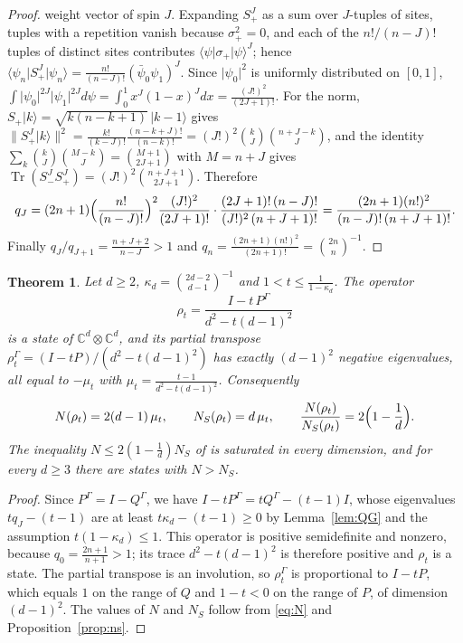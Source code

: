 \documentclass[11pt,a4paper]{article}
\newtheorem{theorem}{Theorem}
\theoremstyle{definition}
\theoremstyle{plain}
\DeclareMathOperator{\Tr}{Tr}
\newcommand{\ket}[1]{\lvert#1\rangle}
\newcommand{\bra}[1]{\langle#1\rvert}
\newcommand{\norm}[1]{\lVert#1\rVert}
\newcommand{\C}{\mathbb{C}}
\newcommand{\NS}{N_{S}}
\newcommand{\G}{\Gamma}
\begin{document}
\begin{proof}
weight vector of spin $J$. Expanding $S_+^J$ as a sum over $J$-tuples of
sites, tuples with a repetition vanish because $\sigma_+^2=0$, and each of the
$n!/(n-J)!$ tuples of distinct sites contributes
$\bra\psi\sigma_+\ket\psi^J$; hence
$\bra{\psi_n}S_+^J\ket{\psi_n}=\frac{n!}{(n-J)!}(\bar\psi_0\psi_1)^J$. Since
$\lvert\psi_0\rvert^2$ is uniformly distributed on $[0,1]$,
$\int\lvert\psi_0\rvert^{2J}\lvert\psi_1\rvert^{2J}d\psi=\int_0^1x^J(1-x)^Jdx
=\frac{(J!)^2}{(2J+1)!}$. For the norm,
$S_+\ket k=\sqrt{k(n-k+1)}\,\ket{k-1}$ gives
$\norm{S_+^J\ket k}^2=\frac{k!}{(k-J)!}\frac{(n-k+J)!}{(n-k)!}
=(J!)^2\binom kJ\binom{n+J-k}{J}$, and the identity
$\sum_k\binom kJ\binom{M-k}{J}=\binom{M+1}{2J+1}$ with $M=n+J$ gives
$\Tr(S_-^JS_+^J)=(J!)^2\binom{n+J+1}{2J+1}$. Therefore
\[
q_J=(2n+1)\Bigl(\frac{n!}{(n-J)!}\Bigr)^2\frac{(J!)^2}{(2J+1)!}\cdot
\frac{(2J+1)!\,(n-J)!}{(J!)^2\,(n+J+1)!}
=\frac{(2n+1)(n!)^2}{(n-J)!\,(n+J+1)!}.
\]
Finally $q_J/q_{J+1}=\frac{n+J+2}{n-J}>1$ and
$q_n=\frac{(2n+1)(n!)^2}{(2n+1)!}=\binom{2n}{n}^{-1}$.
\end{proof}

\begin{theorem}\label{thm:saturation}
Let $d\ge2$, $\kappa_d=\binom{2d-2}{d-1}^{-1}$ and $1<t\le\frac{1}{1-\kappa_d}$.
The operator
\begin{equation}\label{eq:rhot}
\rho_t=\frac{I-t\,P^\G}{d^2-t(d-1)^2}
\end{equation}
is a state of $\C^d\otimes\C^d$, and its partial transpose
$\rho_t^\G=(I-tP)/(d^2-t(d-1)^2)$ has exactly $(d-1)^2$ negative eigenvalues,
all equal to $-\mu_t$ with $\mu_t=\frac{t-1}{d^2-t(d-1)^2}$. Consequently
\[
N(\rho_t)=2(d-1)\,\mu_t,\qquad \NS(\rho_t)=d\,\mu_t,\qquad
\frac{N(\rho_t)}{\NS(\rho_t)}=2\Bigl(1-\frac1d\Bigr).
\]
The inequality $N\le2(1-\frac1d)\NS$ of \cite{KumariAdhikari2022} is
saturated in every dimension, and for every $d\ge3$ there are states with
$N>\NS$.
\end{theorem}
\begin{proof}
Since $P^\G=I-Q^\G$, we have $I-tP^\G=tQ^\G-(t-1)I$, whose eigenvalues
$tq_J-(t-1)$ are at least $t\kappa_d-(t-1)\ge0$ by Lemma~\ref{lem:QG} and the
assumption $t(1-\kappa_d)\le1$. This operator is positive semidefinite and
nonzero, because $q_0=\frac{2n+1}{n+1}>1$; its trace $d^2-t(d-1)^2$ is
therefore positive and $\rho_t$ is a state. The partial transpose is an
involution, so $\rho_t^\G$ is proportional to $I-tP$, which equals $1$ on the
range of $Q$ and $1-t<0$ on the range of $P$, of dimension $(d-1)^2$. The values
of $N$ and $\NS$ follow from \eqref{eq:N} and Proposition~\ref{prop:ns}.
\end{proof}
\end{document}
